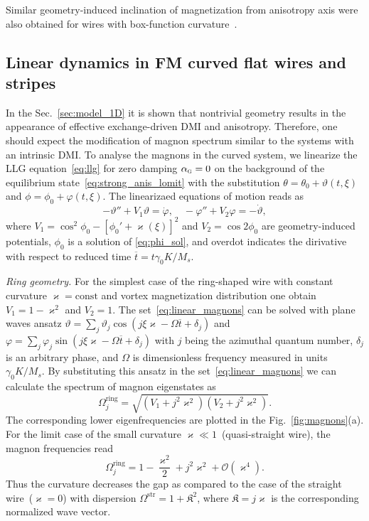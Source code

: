 Similar geometry-induced inclination of magnetization from anisotropy axis were also obtained for wires with box-function curvature~\cite{Gaididei18a}.


\subsection{Linear dynamics in FM curved flat wires and stripes}\label{sec:linear_dyn}

In the Sec.~\ref{sec:model_1D} it is shown that nontrivial geometry results in the appearance of effective exchange-driven DMI and anisotropy. Therefore, one should expect the modification of magnon spectrum similar to the systems with an intrinsic DMI. To analyse the magnons in the curved system, we linearize the LLG equation~\eqref{eq:llg} for zero damping $\alpha_\textsc{g}=0$ on the background of the equilibrium state~\eqref{eq:strong_anis_lomit} with the substitution $\theta=\theta_0+\vartheta(t,\xi)$ and $\phi=\phi_0+\varphi(t,\xi)$. The linearizaed equations of motion reads as~\cite{Sheka15,Gaididei18a,Korniienko19b}
\begin{equation}\label{eq:linear_magnons}
    -\vartheta''+V_1\vartheta = \dot{\varphi},\quad  -\varphi''+V_2\varphi = -\dot{\vartheta},
\end{equation}
where $V_1 = \cos^2\phi_0 - \left[\phi_0'+\varkappa(\xi)\right]^2$ and $V_2 = \cos2\phi_0$ are geometry-induced potentials, $\phi_0$ is a solution of \eqref{eq:phi_sol}, and overdot indicates the dirivative with respect to reduced time $\overline{t}=t\gamma_0K/M_s$.

{\it Ring geometry.} For the simplest case of the ring-shaped wire with constant curvature $\varkappa=\text{const}$ and vortex magnetization distribution one obtain $V_1=1-\varkappa^2$ and $V_2=1$. The set~\eqref{eq:linear_magnons} can be solved with plane waves ansatz $\vartheta=\sum_j \vartheta_j \cos(j\xi\varkappa-\Omega\overline{t}+\delta_j)$ and $\varphi=\sum_j \varphi_j \sin(j\xi\varkappa-\Omega\overline{t}+\delta_j)$ with $j$ being the azimuthal quantum number, $\delta_j$ is an arbitrary phase, and $\Omega$ is dimensionless frequency measured in units $\gamma_0K/M_s$. By substituting this ansatz in the set~\eqref{eq:linear_magnons} we can calculate the spectrum of magnon eigenstates as
\begin{equation}\label{eq:spec_rings}
    \Omega^\text{ring}_j = \sqrt{\left(V_1+j^2\varkappa^2\right)\left(V_2+j^2\varkappa^2\right)}.
\end{equation}
The corresponding lower eigenfrequencies are plotted in the Fig.~\ref{fig:magnons}(a). For the limit case of the small curvature $\varkappa\ll1$~(quasi-straight wire), the magnon frequencies read
\begin{equation}\label{eq:spec_rings_small}
    \Omega^\text{ring}_j = 1- \frac{\varkappa^2}{2}+j^2\varkappa^2+\mathcal{O}(\varkappa^4).
\end{equation}
Thus the curvature decreases the gap as compared to the case of the straight wire~($\varkappa=0$) with dispersion $\Omega^\text{str} = 1 + \mathfrak{K}^2$, where $\mathfrak{K}=j\varkappa$ is the corresponding normalized wave vector.


